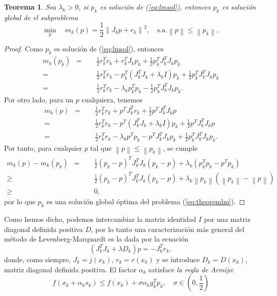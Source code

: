 \documentclass[11pt,a4paper]{book}
\newtheorem{theorem}{Teorema}[chapter]
\theoremstyle{definition}
\theoremstyle{remark}
\newcommand{\norm}[1]{\left\lVert#1\right\rVert}
\begin{document}
\begin{theorem}
	Sea $\lambda_k>0$, si $p_k$ es solución de (\ref{eq:lmsol}), entonces $p_k$ es solución global de el subproblema
\begin{equation}
\label{eq:theoremlm}
\min_{p} \quad m_k(p)=\frac{1}{2} \norm{J_kp+r_k}^2,\quad \text{s.a.} \norm{p} \leq \norm{p_k},
\end{equation}
\end{theorem}
\begin{proof}
	Como $p_k$ es solución de (\ref{eq:lmsol}), entonces
\begin{equation}
\begin{split}
	m_k(p_k)\enspace
	=&\quad \frac{1}{2}r_k^Tr_k+r_k^TJ_kp_k+\frac{1}{2}p_k^TJ_k^TJ_kp_k \\
	=&\quad \frac{1}{2}r_k^Tr_k-p_k^T(J_k^TJ_k+\lambda_kI)p_k+
										\frac{1}{2}p_k^TJ_k^TJ_kp_k \\
	=&\quad \frac{1}{2}r_k^Tr_k-\lambda_kp_k^Tp_k-
										\frac{1}{2}p_k^TJ_k^TJ_kp_k.
\end{split}
\end{equation}
Por otro lado, para un $p$ cualquiera, tenemos
\begin{equation}
\begin{split}
	m_k(p)\enspace
	=&\quad \frac{1}{2}r_k^Tr_k+p^TJ_k^Tr_k+\frac{1}{2}p^TJ_k^TJ_kp \\
	=&\quad \frac{1}{2}r_k^Tr_k-p^T(J_k^TJ_k+\lambda_kI)p_k+
										\frac{1}{2}p^TJ_k^TJ_kp \\
	=&\quad \frac{1}{2}r_k^Tr_k-\lambda_kp^Tp_k
				-p^TJ_k^TJ_kp_k
										+\frac{1}{2}p_k^TJ_k^TJ_kp_k.
\end{split}
\end{equation}
Por tanto, para cualquier $p$ tal que $\norm{p} \leq \norm{p_k}$, se cumple
\begin{equation}
\begin{split}
	m_k(p) - m_k(p_k) \enspace
	=&\quad\frac{1}{2}(p_k-p)^TJ_k^TJ_k(p_k-p) + \lambda_k(p_k^Tp_k-p^Tp_k) \\
	\geq&\quad \frac{1}{2}(p_k-p)^TJ_k^TJ_k(p_k-p)+
									\lambda_k\norm{p_k}(\norm{p_k}-\norm{p}) \\
	\geq&\quad 0,
\end{split}
\end{equation}
por lo que $p_k$ es una solución global óptima del problema (\ref{eq:theoremlm}).
\end{proof}

Como hemos dicho, podemos intercambiar la matriz identidad $I$ por una matriz diagonal definida positiva $D$, por lo tanto una caracterización más general del método de Levenberg-Marquardt es la dada por la ecuación
\begin{equation}
\label{eq:problemaDk}
(J_k^TJ_k+\lambda D_k)p = -J_k^Tr_k,
\end{equation}
donde, como siempre, $J_k=j(x_k)$, $r_k = r(x_k)$ y se introduce $D_k = D(x_k)$, matriz diagonal definida positiva. El factor $\alpha_k$ satisface \textit{la regla de Armijo}:
\begin{equation}
	f(x_k+\alpha_ks_k) \leq f(x_k) + \sigma \alpha_kg_k^Tp_k,\quad \sigma \in \left( 0,\frac{1}{2} \right)
\end{equation}
\end{document}
